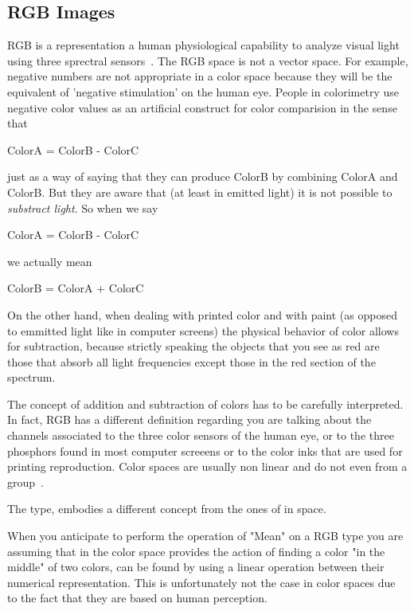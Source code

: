 


\subsection{RGB Images}

 RGB is a representation a human physiological capability to
analyze visual light using three sprectral
sensors~\cite{Malacara2002,Wyszecki2000}.  The RGB space is not a vector space.
For example, negative numbers are not appropriate in a color space because they
will be the equivalent of 'negative stimulation' on the human eye. People in
colorimetry use negative color values as an artificial construct for color
comparision in the sense that

         ColorA = ColorB - ColorC

just as a way of saying that they can produce ColorB by combining ColorA and
ColorB.  But they are aware that (at least in emitted light) it is not possible
to \emph{substract light}. So when we say

         ColorA = ColorB - ColorC

we actually mean

         ColorB = ColorA + ColorC

On the other hand, when dealing with printed color and with paint
(as opposed to emmitted light like in computer screens) the physical
behavior of color allows for subtraction, because strictly speaking
the objects that you see as red are those that absorb all light
frequencies except those in the red section of the spectrum.

The concept of addition and subtraction of colors has to be carefully
interpreted. In fact, RGB has a different definition regarding you are talking
about the channels associated to the three color sensors of the human eye, or
to the three phosphors found in most computer screeens or to the color inks
that are used for printing reproduction.  Color spaces are usually non linear
and do not even from a group~\cite{Wyszecki2000}.

The  type, embodies a different concept from the ones of
 in space.

When you anticipate to perform the operation of "Mean" on a RGB type
you are assuming that in the color space provides the action of finding
a color "in the middle" of two colors, can be found by using a linear
operation between their numerical representation. This is unfortunately
not the case in  color spaces due to the fact that they are based on
human perception.

